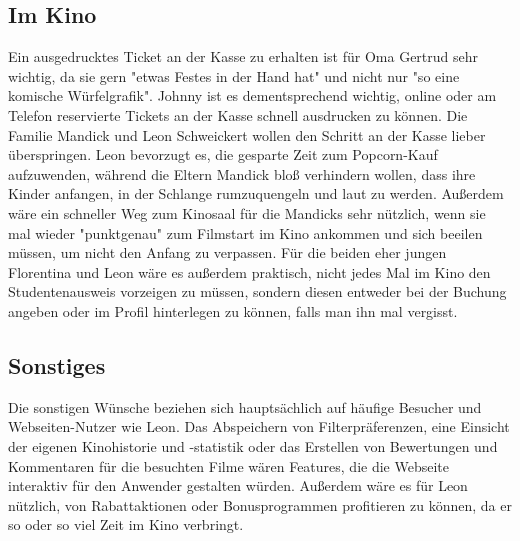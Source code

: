 \subsection{Im Kino}
Ein ausgedrucktes Ticket an der Kasse zu erhalten ist für Oma Gertrud sehr wichtig, da sie gern "etwas Festes in der Hand hat" und nicht nur "so eine komische Würfelgrafik".
Johnny ist es dementsprechend wichtig, online oder am Telefon reservierte Tickets an der Kasse schnell ausdrucken zu können.
Die Familie Mandick und Leon Schweickert wollen den Schritt an der Kasse lieber überspringen.
Leon bevorzugt es, die gesparte Zeit zum Popcorn-Kauf aufzuwenden, während die Eltern Mandick bloß verhindern wollen, dass ihre Kinder anfangen, in der Schlange rumzuquengeln und laut zu werden.
Außerdem wäre ein schneller Weg zum Kinosaal für die Mandicks sehr nützlich, wenn sie mal wieder "punktgenau" zum Filmstart im Kino ankommen und sich beeilen müssen, um nicht den Anfang zu verpassen.
Für die beiden eher jungen Florentina und Leon wäre es außerdem praktisch, nicht jedes Mal im Kino den Studentenausweis vorzeigen zu müssen, sondern diesen entweder bei der Buchung angeben oder im Profil hinterlegen zu können, falls man ihn mal vergisst.

\subsection{Sonstiges}
Die sonstigen Wünsche beziehen sich hauptsächlich auf häufige Besucher und Webseiten-Nutzer wie Leon.
Das Abspeichern von Filterpräferenzen, eine Einsicht der eigenen Kinohistorie und -statistik oder das Erstellen von Bewertungen und Kommentaren für die besuchten Filme wären Features, die die Webseite interaktiv für den Anwender gestalten würden.
Außerdem wäre es für Leon nützlich, von Rabattaktionen oder Bonusprogrammen profitieren zu können, da er so oder so viel Zeit im Kino verbringt.
